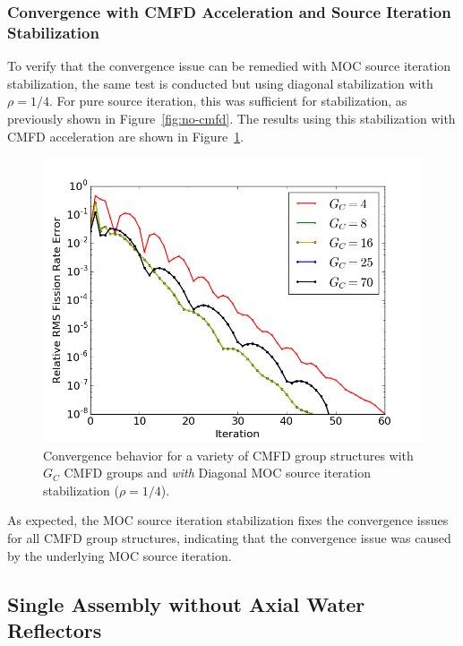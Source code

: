 \subsubsection{Convergence with CMFD Acceleration and Source Iteration Stabilization}

To verify that the convergence issue can be remedied with \ac{MOC} source iteration stabilization, the same test is conducted but using diagonal stabilization with $\rho = 1/4$. For pure source iteration, this was sufficient for stabilization, as previously shown in Figure~\ref{fig:no-cmfd}. The results using this stabilization with \ac{CMFD} acceleration are shown in Figure~\ref{fig:sa-cmfd-stab}. 
\begin{figure}[ht!]
	\centering
	\includegraphics[width=0.65\linewidth]{figures/convergence/sa_stab_cmfd.png}
	\caption{Convergence behavior for a variety of \ac{CMFD} group structures with $G_C$ \ac{CMFD} groups and \textit{with} Diagonal \ac{MOC} source iteration stabilization ($\rho = 1/4$).}
	\label{fig:sa-cmfd-stab}
\end{figure}
As expected, the \ac{MOC} source iteration stabilization fixes the convergence issues for all \ac{CMFD} group structures, indicating that the convergence issue was caused by the underlying \ac{MOC} source iteration.

\subsection{Single Assembly without Axial Water Reflectors}
\label{sec:sa-no-axial-ref}

